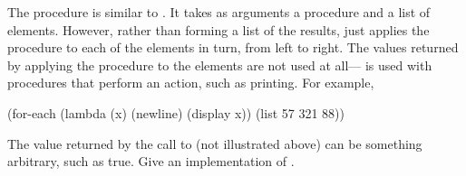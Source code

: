 \begin{exercise}
	\label{Exercise 2.23}
	The procedure  is similar to .
	It takes as arguments a procedure and a list of elements.
	However, rather than forming a list of the results,  just applies the procedure to each of the elements in turn, from left to right.
	The values returned by applying the procedure to the elements are not used at all--- is used with procedures that perform an action, such as printing.
	For example,
	\begin{scheme}
	  (for-each (lambda (x)
	              (newline)
	              (display x))
	            (list 57 321 88))
	  ~~
	  ~~
	  ~~
	\end{scheme}
	The value returned by the call to  (not illustrated above) can be something arbitrary, such as true.
	Give an implementation of .
\end{exercise}

